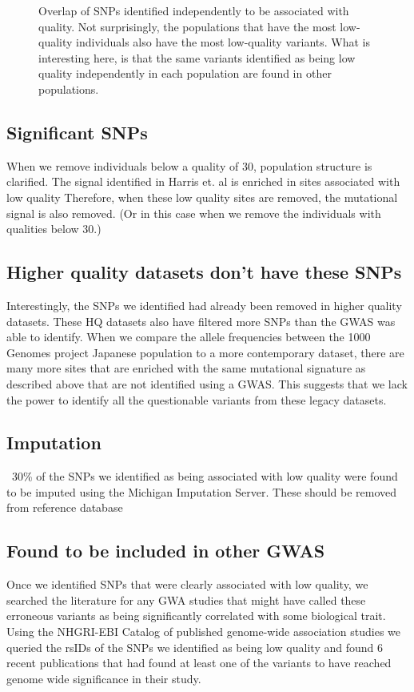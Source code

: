 \documentclass[12pt]{amsart}
\begin{document}
{\begin{figure}
\caption{Overlap of SNPs identified independently to be associated with quality. Not surprisingly, the populations that have the most low-quality individuals also have the most low-quality variants. What is interesting here, is that the same variants identified as being low quality independently in each population are found in other populations. }
  \label{Figure3}
\end{figure}

	\subsection{Significant SNPs}
When we remove individuals below a quality of 30, population structure is clarified. 
The signal identified in Harris et. al is enriched in sites associated with low quality
Therefore, when these low quality sites are removed, the mutational signal is also removed. (Or in this case when we remove the individuals with qualities below 30.)

	\subsection{Higher quality datasets don't have these SNPs}

Interestingly, the SNPs we identified had already been removed in higher quality datasets. 
These HQ datasets also have filtered more SNPs than the GWAS was able to identify. 
When we compare the allele frequencies between the 1000 Genomes project Japanese population to a more contemporary dataset, there are many more sites that are enriched with the same mutational signature as described above that are not identified using a GWAS. 
This suggests that we lack the power to identify all the questionable variants from these legacy datasets. 

	\subsection{Imputation}
~30\% of the SNPs we identified as being associated with low quality were found to be imputed using the Michigan Imputation Server. These  should be removed from reference database

	\subsection{Found to be included in other GWAS}
Once we identified SNPs that were clearly associated with low quality, we searched the literature for any GWA studies that might have called these erroneous variants as being significantly correlated with some biological trait. 
Using the NHGRI-EBI Catalog of published genome-wide association studies we queried the rsIDs of the SNPs we identified as being low quality and found 6 recent publications that had found at least one of the variants to have reached genome wide significance in their study. 

}
\end{document}
